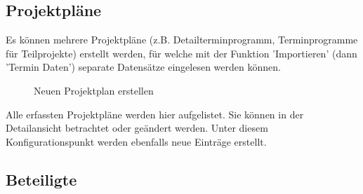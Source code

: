 \subsection{Projektpläne}

Es können mehrere Projektpläne (z.B. Detailterminprogramm, Terminprogramme für Teilprojekte) erstellt werden, für welche mit der Funktion 'Importieren' (dann  'Termin Daten') separate Datensätze eingelesen werden können.

\begin{figure}[H]
\caption{Neuen Projektplan erstellen}
\end{figure}

Alle erfassten Projektpläne werden hier aufgelistet. Sie können in der Detailansicht betrachtet oder geändert werden. Unter diesem Konfigurationspunkt werden ebenfalls neue Einträge erstellt.

\pagebreak
\subsection{Beteiligte}
\label{bkm:Ref2018071602}

